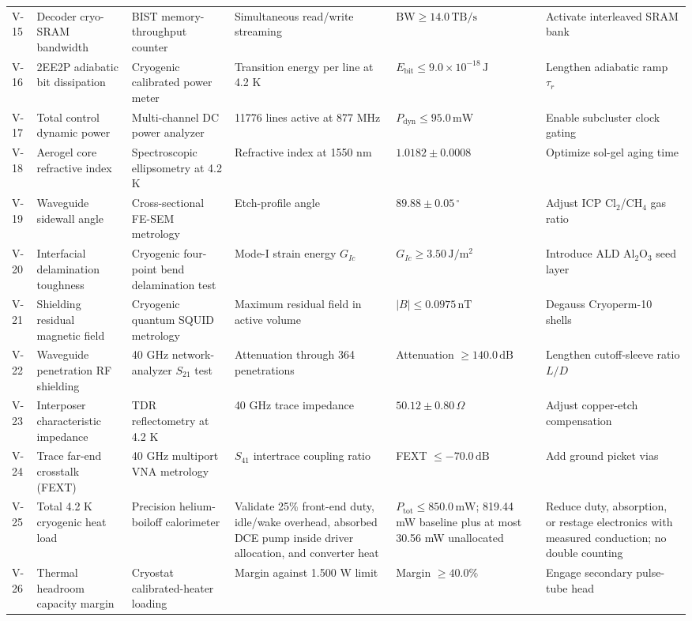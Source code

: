 \documentclass[11pt,a4paper]{article}
\newcommand{\unit}[1]{\,\mathrm{#1}}
\begin{document}
\begin{landscape}
\begin{longtable}{@{}P{0.85cm}P{4.05cm}P{4.15cm}P{4.7cm}P{3.6cm}P{4.3cm}@{}}
V-15 & Decoder cryo-SRAM bandwidth & BIST memory-throughput counter & Simultaneous read/write streaming & $\mathrm{BW}\ge14.0\unit{TB/s}$ & Activate interleaved SRAM bank\\
V-16 & 2EE2P adiabatic bit dissipation & Cryogenic calibrated power meter & Transition energy per line at 4.2 K & $E_{\mathrm{bit}}\le9.0\times10^{-18}\unit J$ & Lengthen adiabatic ramp $\tau_r$\\
V-17 & Total control dynamic power & Multi-channel DC power analyzer & 11776 lines active at 877 MHz & $P_{\mathrm{dyn}}\le95.0\unit{mW}$ & Enable subcluster clock gating\\
V-18 & Aerogel core refractive index & Spectroscopic ellipsometry at 4.2 K & Refractive index at 1550 nm & $1.0182\pm0.0008$ & Optimize sol-gel aging time\\
V-19 & Waveguide sidewall angle & Cross-sectional FE-SEM metrology & Etch-profile angle & $89.88\pm0.05\,^{\circ}$ & Adjust ICP Cl$_2$/CH$_4$ gas ratio\\
V-20 & Interfacial delamination toughness & Cryogenic four-point bend delamination test & Mode-I strain energy $G_{Ic}$ & $G_{Ic}\ge3.50\unit{J/m^2}$ & Introduce ALD Al$_2$O$_3$ seed layer\\
V-21 & Shielding residual magnetic field & Cryogenic quantum SQUID metrology & Maximum residual field in active volume & $|B|\le0.0975\unit{nT}$ & Degauss Cryoperm-10 shells\\
V-22 & Waveguide penetration RF shielding & 40 GHz network-analyzer $S_{21}$ test & Attenuation through 364 penetrations & Attenuation $\ge140.0\unit{dB}$ & Lengthen cutoff-sleeve ratio $L/D$\\
V-23 & Interposer characteristic impedance & TDR reflectometry at 4.2 K & 40 GHz trace impedance & $50.12\pm0.80\,\Omega$ & Adjust copper-etch compensation\\
V-24 & Trace far-end crosstalk (FEXT) & 40 GHz multiport VNA metrology & $S_{41}$ intertrace coupling ratio & FEXT $\le-70.0\unit{dB}$ & Add ground picket vias\\
V-25 & Total 4.2 K cryogenic heat load & Precision helium-boiloff calorimeter & Validate 25\% front-end duty, idle/wake overhead, absorbed DCE pump inside driver allocation, and converter heat & $P_{\mathrm{tot}}\le850.0\unit{mW}$; 819.44 mW baseline plus at most 30.56 mW unallocated & Reduce duty, absorption, or restage electronics with measured conduction; no double counting\\
V-26 & Thermal headroom capacity margin & Cryostat calibrated-heater loading & Margin against 1.500 W limit & Margin $\ge40.0\%$ & Engage secondary pulse-tube head\\

\end{longtable}
\end{landscape}
\end{document}
